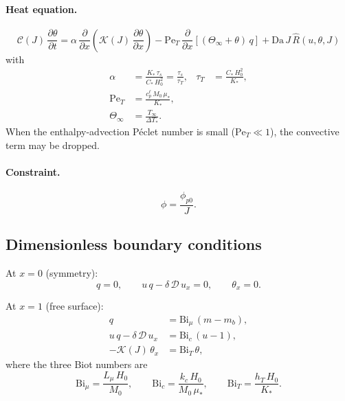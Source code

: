 \documentclass[aps,pre,reprint,superscriptaddress,longbibliography,floatfix]{revtex4-2}
\newcommand{\Ds}{\mathcal{D}}
\newcommand{\Cs}{\mathcal{C}}
\newcommand{\Ks}{\mathcal{K}}
\newcommand{\Da}{\mathrm{Da}}
\newcommand{\Bi}{\mathrm{Bi}}
\newcommand{\Pe}{\mathrm{Pe}}
\newcommand{\Rhat}{\widehat{R}}
\newcommand{\pp}{\phi_{p0}}
\begin{document}
\paragraph{Heat equation.}
\begin{equation}
  \boxed{
  \Cs(J)\,\frac{\partial\theta}{\partial t}
  = \alpha\,\frac{\partial}{\partial x}\!\left(\Ks(J)\,\frac{\partial\theta}{\partial x}\right)
  - \Pe_T\,\frac{\partial}{\partial x}\!\left[(\Theta_\infty + \theta)\,q\right]
  + \Da\,J\,\Rhat(u,\theta,J)
  }
  \label{eq:theta_nondim}
\end{equation}
with
\begin{align}
  \alpha &= \frac{K_*\,\tau_s}{C_*\,H_0^2} = \frac{\tau_s}{\tau_T},
  &\tau_T &= \frac{C_*\,H_0^2}{K_*}, \label{eq:alpha} \\
  \Pe_T &= \frac{c_p^\ell\,M_0\,\mu_*}{K_*}, \label{eq:PeT} \\
  \Theta_\infty &= \frac{T_\infty}{\Delta T_*}. \label{eq:Theta_inf}
\end{align}
When the enthalpy-advection Péclet number is small ($\Pe_T \ll 1$), the convective term may be dropped.

\paragraph{Constraint.}
\begin{equation}
  \phi = \frac{\pp}{J}.
\end{equation}

\subsection{Dimensionless boundary conditions}

At $x=0$ (symmetry):
\begin{equation}
  q = 0, \qquad
  u\,q - \delta\,\Ds\,u_x = 0, \qquad
  \theta_x = 0.
  \label{eq:bc0_nondim}
\end{equation}

At $x=1$ (free surface):
\begin{align}
  q &= \Bi_\mu\,(m - m_b), \label{eq:bc1_mu} \\
  u\,q - \delta\,\Ds\,u_x &= \Bi_c\,(u - 1), \label{eq:bc1_c} \\
  -\Ks(J)\,\theta_x &= \Bi_T\,\theta, \label{eq:bc1_T}
\end{align}
where the three Biot numbers are
\begin{equation}
  \Bi_\mu = \frac{L_\mu\,H_0}{M_0},
  \qquad
  \Bi_c = \frac{k_c\,H_0}{M_0\,\mu_*},
  \qquad
  \Bi_T = \frac{h_T\,H_0}{K_*}.
  \label{eq:Bi}
\end{equation}
\end{document}
